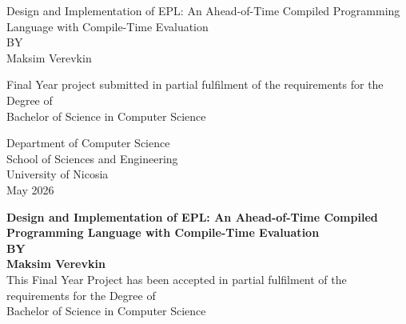 \documentclass[a4paper,12pt,oneside]{book}
\newcommand{\thesistitle}{Design and Implementation of EPL: An Ahead-of-Time Compiled Programming Language with Compile-Time Evaluation}
\newcommand{\thesisauthor}{Maksim Verevkin}
\newcommand{\submissiondate}{May 2026}
\begin{document}
\frontmatter
\pagestyle{empty}

{}
\clearpage
\begin{center}
  \bfseries
  \large

  {\LARGE \thesistitle}\\
  BY\\
  {\Large \thesisauthor}\\


  Final Year project submitted in partial fulfilment of the
  requirements for the Degree of\\
  Bachelor of Science in Computer Science


  Department of Computer Science\\
  School of Sciences and Engineering\\
  University of Nicosia\\
  \submissiondate
\end{center}
\pagebreak

{}
\clearpage
\normalsize
\begin{center}
{\bf
{\large \thesistitle}\\
{\normalsize BY}\\
{\large \thesisauthor}\\}
\smallbreak
This Final Year Project has been accepted in partial fulfilment of the
requirements for the Degree of\\
Bachelor of Science in Computer Science
\end{center}
\end{document}
